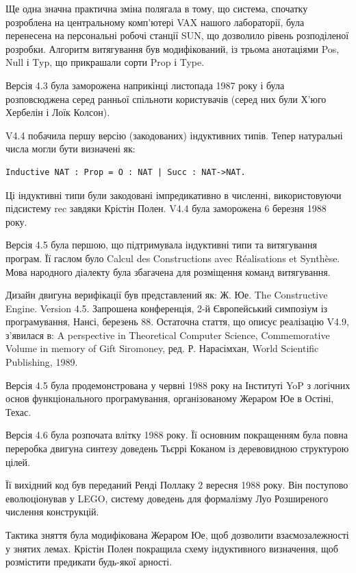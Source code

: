 \documentclass{article}
\begin{document}
Ще одна значна практична зміна полягала в тому, що система, спочатку розроблена на центральному комп’ютері VAX нашого лабораторії, була перенесена на персональні робочі станції SUN, що дозволило рівень розподіленої розробки. Алгоритм витягування був модифікований, із трьома анотаціями Pos, Null і Typ, що прикрашали сорти Prop і Type.

Версія 4.3 була заморожена наприкінці листопада 1987 року і була розповсюджена серед ранньої спільноти користувачів (серед них були Х’юго Хербелін і Лоїк Колсон).

V4.4 побачила першу версію (закодованих) індуктивних типів. Тепер натуральні числа могли бути визначені як:

\begin{verbatim}
Inductive NAT : Prop = O : NAT | Succ : NAT->NAT.
\end{verbatim}

Ці індуктивні типи були закодовані імпредикативно в численні, використовуючи підсистему rec завдяки Крістін Полен. V4.4 була заморожена 6 березня 1988 року.

Версія 4.5 була першою, що підтримувала індуктивні типи та витягування програм. Її гаслом було Calcul des Constructions avec Réalisations et Synthèse. Мова народного діалекту була збагачена для розміщення команд витягування.

Дизайн двигуна верифікації був представлений як: Ж. Юе. The Constructive Engine. Version 4.5. Запрошена конференція, 2-й Європейський симпозіум із програмування, Нансі, березень 88. Остаточна стаття, що описує реалізацію V4.9, з’явилася в: A perspective in Theoretical Computer Science, Commemorative Volume in memory of Gift Siromoney, ред. Р. Нарасімхан, World Scientific Publishing, 1989.

Версія 4.5 була продемонстрована у червні 1988 року на Інституті YoP з логічних основ функціонального програмування, організованому Жераром Юе в Остіні, Техас.

Версія 4.6 була розпочата влітку 1988 року. Її основним покращенням була повна переробка двигуна синтезу доведень Тьєррі Коканом із деревовидною структурою цілей.

Її вихідний код був переданий Ренді Поллаку 2 вересня 1988 року. Він поступово еволюціонував у LEGO, систему доведень для формалізму Луо Розширеного числення конструкцій.

Тактика зняття була модифікована Жераром Юе, щоб дозволити взаємозалежності у знятих лемах. Крістін Полен покращила схему індуктивного визначення, щоб розмістити предикати будь-якої арності.
\end{document}
